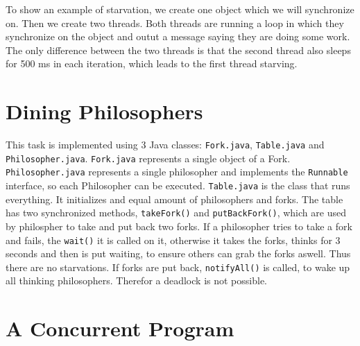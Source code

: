 \documentclass{article}
\begin{document}
  To show an example of starvation, we create one object which we will synchronize on. Then we create two threads. Both threads are running a loop in which they synchronize on the object and outut a message saying they are doing some work. The only difference between the two threads is that the second thread also sleeps for 500 ms in each iteration, which leads to the first thread starving.

  \section{Dining Philosophers}

  This task is implemented using 3 Java classes: \texttt{Fork.java}, \texttt{Table.java} and \texttt{Philosopher.java}. \texttt{Fork.java} represents a single object of a Fork. \texttt{Philosopher.java} represents a single philosopher and implements the \texttt{Runnable} interface, so each Philosopher can be executed. \texttt{Table.java} is the class that runs everything. It initializes and equal amount of philosophers and forks. The table has two synchronized methods, \texttt{takeFork()} and \texttt{putBackFork()}, which are used by philospher to take and put back two forks. If a philosopher tries to take a fork and fails, the \texttt{wait()} it is called on it, otherwise it takes the forks, thinks for 3 seconds and then is put waiting, to ensure others can grab the forks aswell. Thus there are no starvations. If forks are put back, \texttt{notifyAll()} is called, to wake up all thinking philosophers. Therefor a deadlock is not possible.

  \section{A Concurrent Program}
\end{document}
